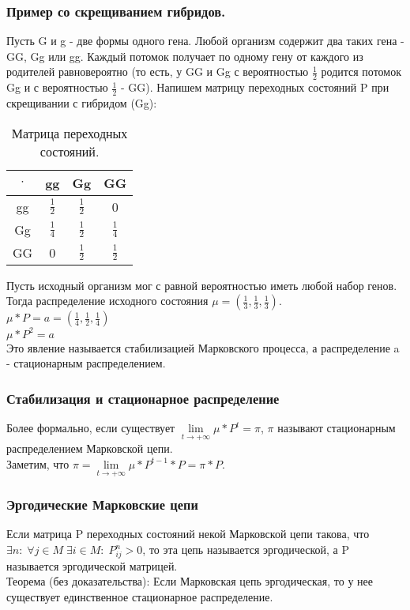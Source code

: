 \subsubsection{Пример со скрещиванием гибридов.}
Пусть G и g - две формы одного гена. Любой организм содержит два таких гена - GG, Gg или gg. Каждый потомок получает по одному гену от каждого из родителей равновероятно (то есть, у GG и Gg с вероятностью $\frac{1}{2}$ родится потомок Gg и с вероятностью $\frac{1}{2}$ - GG). Напишем матрицу переходных состояний P при скрещивании с гибридом (Gg):\\
\begin{table}[H]
\caption{Матрица переходных состояний.}
\label{tabular:TransitionStatesMatrix}
\begin{center}
\begin{tabular}{|c|c|c|c|}
\hline
$\cdot$ & gg & Gg & GG\\
\hline
gg & $\frac{1}{2}$ & $\frac{1}{2}$ & 0\\
\hline
Gg & $\frac{1}{4}$ & $\frac{1}{2}$ & $\frac{1}{4}$\\
\hline
GG & 0 & $\frac{1}{2}$ & $\frac{1}{2}$\\
\hline
\end{tabular}
\end{center}
\end{table}
Пусть исходный организм мог с равной вероятностью иметь любой набор генов. Тогда распределение исходного состояния $\mu = (\frac{1}{3}, \frac{1}{3}, \frac{1}{3})$.\\
$\mu * P = a = (\frac{1}{4}, \frac{1}{2}, \frac{1}{4})$\\
$\mu * P^2 = a$\\
Это явление называется стабилизацией Марковского процесса, а распределение a - стационарным распределением.
\subsubsection{Стабилизация и стационарное распределение}
Более формально, если существует $\lim\limits_{t \to +\infty} \mu * P^t = \pi$, $\pi$ называют стационарным распределением Марковской цепи.\\
Заметим, что $\pi = \lim\limits_{t \to +\infty} \mu * P^{t - 1} * P = \pi * P$.\\
\subsubsection{Эргодические Марковские цепи}
Если матрица P переходных состояний некой Марковской цепи такова, что $\exists n: \; \forall j \in M \; \exists i \in M: \; P^n_{ij} > 0$, то эта цепь называется эргодической, а P называется эргодической матрицей.\\
Теорема (без доказательства): Если Марковская цепь эргодическая, то у нее существует единственное стационарное распределение.